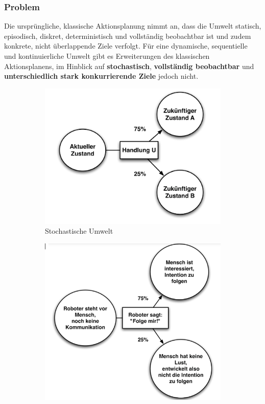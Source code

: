 \subsubsection{Problem}
Die urspr\"ungliche, klassische Aktionsplanung nimmt an, dass die Umwelt statisch, episodisch, diskret, deterministisch und vollst\"andig beobachtbar ist und zudem konkrete, nicht \"uberlappende Ziele verfolgt. 
F\"ur eine dynamische, sequentielle und kontinuierliche Umwelt gibt es Erweiterungen des klassischen Aktionsplanens, im Hinblick auf \textbf{stochastisch}, \textbf{vollst\"andig beobachtbar} und \textbf{unterschiedlich stark konkurrierende Ziele} jedoch nicht.
%
\begin{figure}[ht]
	\centering 
	\begin{subfigure}{.45\textwidth}
		\includegraphics[width=\textwidth]{figures/ch07_stochastischeUmwelt.png}
		\caption{Stochastische Umwelt}
		\label{ch07_stumwelt}
	\end{subfigure}
	\begin{subfigure}{.4\textwidth}
		\includegraphics[width=\textwidth]{figures/ch07_umwelt-bsp.png}

\end{subfigure}
\end{figure}
